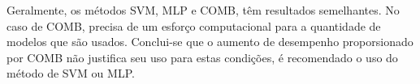 \documentclass[12pt]{article}
\begin{document}
Geralmente, os métodos SVM, MLP e COMB, têm resultados semelhantes. No caso de COMB, precisa de um esforço computacional  para a quantidade de modelos que são usados. Conclui-se que o aumento de desempenho proporsionado por COMB não justifica seu uso para estas condições, é recomendado o uso do método de SVM ou MLP.





%
%
%
%
%
%
\end{document}
